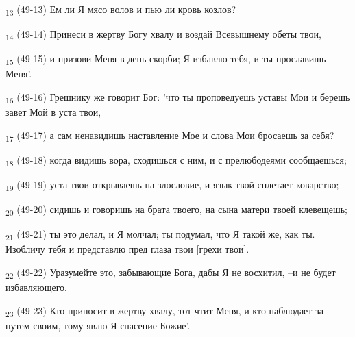 \begin{tcolorbox}
\textsubscript{13} (49-13) Ем ли Я мясо волов и пью ли кровь козлов?
\end{tcolorbox}
\begin{tcolorbox}
\textsubscript{14} (49-14) Принеси в жертву Богу хвалу и воздай Всевышнему обеты твои,
\end{tcolorbox}
\begin{tcolorbox}
\textsubscript{15} (49-15) и призови Меня в день скорби; Я избавлю тебя, и ты прославишь Меня'.
\end{tcolorbox}
\begin{tcolorbox}
\textsubscript{16} (49-16) Грешнику же говорит Бог: 'что ты проповедуешь уставы Мои и берешь завет Мой в уста твои,
\end{tcolorbox}
\begin{tcolorbox}
\textsubscript{17} (49-17) а сам ненавидишь наставление Мое и слова Мои бросаешь за себя?
\end{tcolorbox}
\begin{tcolorbox}
\textsubscript{18} (49-18) когда видишь вора, сходишься с ним, и с прелюбодеями сообщаешься;
\end{tcolorbox}
\begin{tcolorbox}
\textsubscript{19} (49-19) уста твои открываешь на злословие, и язык твой сплетает коварство;
\end{tcolorbox}
\begin{tcolorbox}
\textsubscript{20} (49-20) сидишь и говоришь на брата твоего, на сына матери твоей клевещешь;
\end{tcolorbox}
\begin{tcolorbox}
\textsubscript{21} (49-21) ты это делал, и Я молчал; ты подумал, что Я такой же, как ты. Изобличу тебя и представлю пред глаза твои [грехи твои].
\end{tcolorbox}
\begin{tcolorbox}
\textsubscript{22} (49-22) Уразумейте это, забывающие Бога, дабы Я не восхитил, --и не будет избавляющего.
\end{tcolorbox}
\begin{tcolorbox}
\textsubscript{23} (49-23) Кто приносит в жертву хвалу, тот чтит Меня, и кто наблюдает за путем своим, тому явлю Я спасение Божие'.
\end{tcolorbox}

